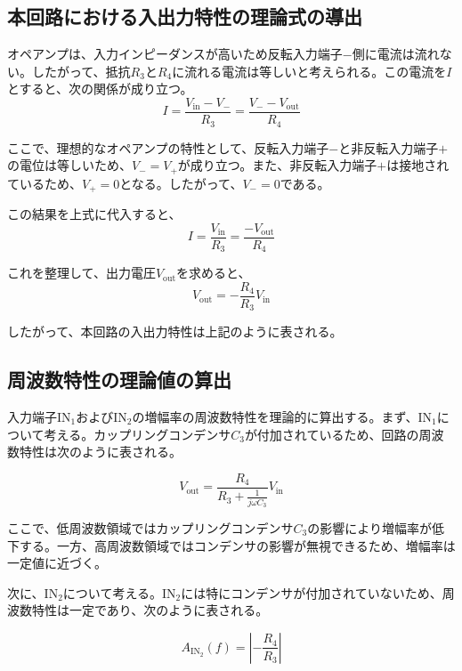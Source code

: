 \documentclass{jlreq}
\numberwithin{equation}{section}
\begin{document}
\subsection{本回路における入出力特性の理論式の導出}
オペアンプは、入力インピーダンスが高いため反転入力端子\(-\)側に電流は流れない。したがって、抵抗\(R_3\)と\(R_4\)に流れる電流は等しいと考えられる。この電流を\(I\)とすると、次の関係が成り立つ。
\begin{equation}
  I = \frac{V_\text{in} - V_-}{R_3} = \frac{V_- - V_\text{out}}{R_4}
\end{equation}

ここで、理想的なオペアンプの特性として、反転入力端子\(-\)と非反転入力端子\(+\)の電位は等しいため、\(V_- = V_+\)が成り立つ。また、非反転入力端子\(+\)は接地されているため、\(V_+ = 0\)となる。したがって、\(V_- = 0\)である。

この結果を上式に代入すると、
\begin{equation}
  I = \frac{V_\text{in}}{R_3} = \frac{-V_\text{out}}{R_4}
\end{equation}

これを整理して、出力電圧\(V_\text{out}\)を求めると、
\begin{equation}
  V_\text{out} = -\frac{R_4}{R_3}V_\text{in}
\end{equation}

したがって、本回路の入出力特性は上記のように表される。

\subsection{周波数特性の理論値の算出}
入力端子\(\text{IN}_1\)および\(\text{IN}_2\)の増幅率の周波数特性を理論的に算出する。まず、\(\text{IN}_1\)について考える。カップリングコンデンサ\(C_3\)が付加されているため、回路の周波数特性は次のように表される。

\begin{equation}
  V_\text{out} = \frac{R_4}{R_3 + \frac{1}{j\omega C_3}} V_\text{in}
\end{equation}

ここで、低周波数領域ではカップリングコンデンサ\(C_3\)の影響により増幅率が低下する。一方、高周波数領域ではコンデンサの影響が無視できるため、増幅率は一定値に近づく。

次に、\(\text{IN}_2\)について考える。\(\text{IN}_2\)には特にコンデンサが付加されていないため、周波数特性は一定であり、次のように表される。

\begin{equation}
  A_{\text{IN}_2}(f) = \left| -\frac{R_4}{R_3} \right|
\end{equation}
\end{document}
